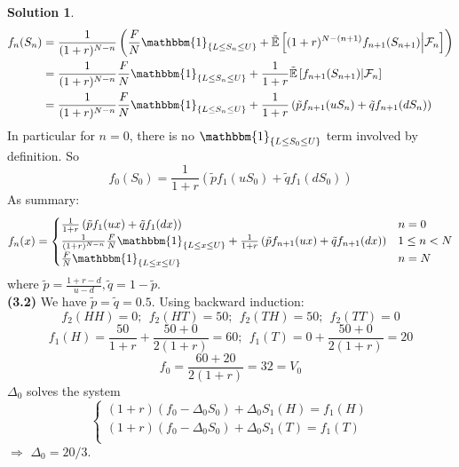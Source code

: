 \documentclass[a4paper, 10pt]{article}
\theoremstyle{definition}
\theoremstyle{hSol}
\newtheorem*{solution}{Solution}
\begin{document}
\begin{solution}
\begin{equation}
  \begin{split}
    f_{n}(S_{n}) &= \frac{1}{(1+r)^{N-n}}\left(\frac{F}{N}\mathbbm{1}_{\{L\leq S_n\leq U\}} +\tilde{\mathbb{E}}\left[(1+r)^{N-(n+1)}f_{n+1}(S_{n+1})\middle|\mathcal{F}_{n}\right]\right) \\
    &=\frac{1}{(1+r)^{N-n}}\frac{F}{N}\mathbbm{1}_{\{L\leq S_n\leq U\}} + \frac{1}{1+r}\tilde{\mathbb{E}}\left[f_{n+1}(S_{n+1})\middle|\mathcal{F}_{n}\right]\\
    &= \frac{1}{(1+r)^{N-n}}\frac{F}{N}\mathbbm{1}_{\{L\leq S_n\leq U\}} + \frac{1}{1+r}\left(\tilde{p}f_{n+1}(uS_n) + \tilde{q}f_{n+1}(dS_n)\right)
  \end{split}
\end{equation}
In particular for $n=0$, there is no $\mathbbm{1}_{\{L\leq S_0 \leq U\}}$ term involved by definition. So
\begin{equation}
  f_0(S_0) = \frac{1}{1+r}\left(\tilde{p}f_{1}(uS_0) + \tilde{q}f_{1}(dS_0)\right)
\end{equation}
As summary:
\begin{equation}
  f_n(x) = \begin{cases}
  \frac{1}{1+r}\left(\tilde{p}f_{1}(ux) + \tilde{q}f_{1}(dx)\right) & n=0 \\
  \frac{1}{(1+r)^{N-n}}\frac{F}{N}\mathbbm{1}_{\{L\leq x\leq U\}} + \frac{1}{1+r}\left(\tilde{p}f_{n+1}(ux) + \tilde{q}f_{n+1}(dx)\right) & 1\leq n< N\\
  \frac{F}{N} \mathbbm{1}_{\{L \leq x \leq U\}} & n=N
  \end{cases}
\end{equation}
where $\tilde{p}=\tfrac{1+r-d}{u-d}, \tilde{q}=1- \tilde{p}$.\\
\textbf{(3.2)} We have $\tilde{p} = \tilde{q} = 0.5$. Using backward induction:
$$
f_2(HH) = 0;~~f_2(HT)=50;~~f_2(TH)=50;~~f_2(TT)=0
$$
$$
f_1(H) = \frac{50}{1+r}+\frac{50+0}{2(1+r)}=60;~~f_1(T)=0+\frac{50+0}{2(1+r)}=20
$$
$$
f_0 = \frac{60+20}{2(1+r)} = 32 = V_0
$$
$\Delta_0$ solves the system
\begin{equation}
  \begin{cases}
  (1+r)(f_0 - \Delta_0S_0) + \Delta_0S_1(H) = f_1(H)\\
  (1+r)(f_0 - \Delta_0S_0) + \Delta_0S_1(T) = f_1(T)\\
  \end{cases}
\end{equation}
$\Rightarrow$ $\Delta_0 = 20/3$.
\end{solution}
\end{document}
